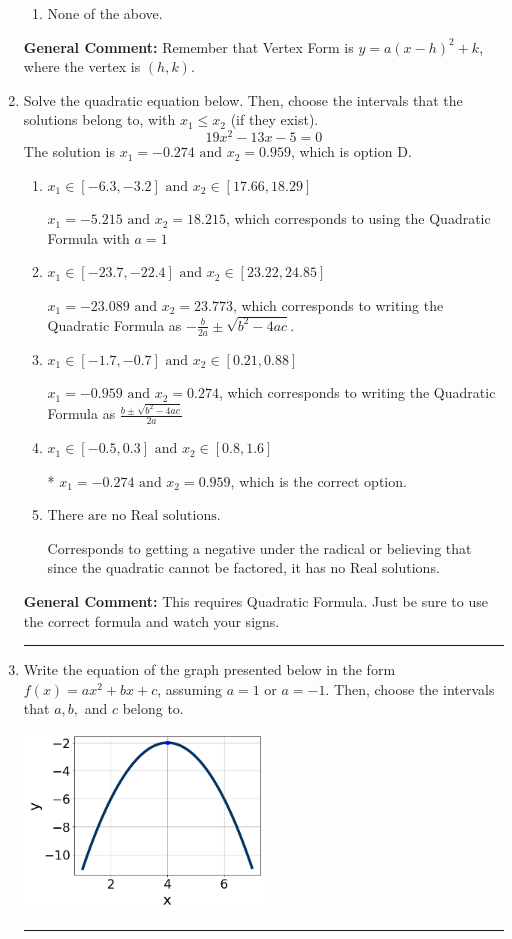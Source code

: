 \documentclass{extbook}[14pt]
\newcommand{\litem}[1]{\item #1

\rule{\textwidth}{0.4pt}}
\begin{document}
\begin{enumerate}
{\begin{enumerate}[label=\Alph*.]
\begin{multicols}{2}
\end{multicols}\item None of the above.\end{enumerate}
\textbf{General Comment:} Remember that Vertex Form is $y = a(x-h)^2+k$, where the vertex is $(h, k)$.
}
\litem{
Solve the quadratic equation below. Then, choose the intervals that the solutions belong to, with $x_1 \leq x_2$ (if they exist).
\[ 19x^{2} -13 x -5 = 0 \]The solution is \( x_1 = -0.274 \text{ and } x_2 = 0.959 \), which is option D.\begin{enumerate}[label=\Alph*.]
\item \( x_1 \in [-6.3, -3.2] \text{ and } x_2 \in [17.66, 18.29] \)

 $x_1 = -5.215 \text{ and } x_2 = 18.215$, which corresponds to using the Quadratic Formula with $a=1$
\item \( x_1 \in [-23.7, -22.4] \text{ and } x_2 \in [23.22, 24.85] \)

 $x_1 = -23.089 \text{ and } x_2 = 23.773$, which corresponds to writing the Quadratic Formula as $-\frac{b}{2a} \pm \sqrt{b^2 - 4ac}$.
\item \( x_1 \in [-1.7, -0.7] \text{ and } x_2 \in [0.21, 0.88] \)

 $x_1 = -0.959 \text{ and } x_2 = 0.274$, which corresponds to writing the Quadratic Formula as $\frac{b \pm \sqrt{b^2 - 4ac}}{2a}$
\item \( x_1 \in [-0.5, 0.3] \text{ and } x_2 \in [0.8, 1.6] \)

* $x_1 = -0.274 \text{ and } x_2 = 0.959$, which is the correct option.
\item \( \text{There are no Real solutions.} \)

Corresponds to getting a negative under the radical or believing that since the quadratic cannot be factored, it has no Real solutions.
\end{enumerate}

\textbf{General Comment:} This requires Quadratic Formula. Just be sure to use the correct formula and watch your signs.
}
\litem{
Write the equation of the graph presented below in the form $f(x)=ax^2+bx+c$, assuming  $a=1$ or $a=-1$. Then, choose the intervals that $a, b,$ and $c$ belong to.

\begin{center}
    \includegraphics[width=0.5\textwidth]{../Figures/quadraticGraphToEquationB.png}
\end{center}


}
\end{enumerate}
\end{document}
